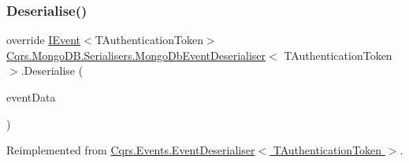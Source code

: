 \subsubsection{\texorpdfstring{Deserialise()}{Deserialise()}}
{\footnotesize\ttfamily override \hyperlink{interfaceCqrs_1_1Events_1_1IEvent}{I\+Event}$<$T\+Authentication\+Token$>$ \hyperlink{classCqrs_1_1MongoDB_1_1Serialisers_1_1MongoDbEventDeserialiser}{Cqrs.\+Mongo\+D\+B.\+Serialisers.\+Mongo\+Db\+Event\+Deserialiser}$<$ T\+Authentication\+Token $>$.Deserialise (\begin{DoxyParamCaption}\item[{\hyperlink{classCqrs_1_1Events_1_1EventData}{Event\+Data}}]{event\+Data }\end{DoxyParamCaption})\hspace{0.3cm}{\ttfamily [virtual]}}



Reimplemented from \hyperlink{classCqrs_1_1Events_1_1EventDeserialiser_a193feac1d58446f0a7447d8ba04179fc}{Cqrs.\+Events.\+Event\+Deserialiser$<$ T\+Authentication\+Token $>$}.

